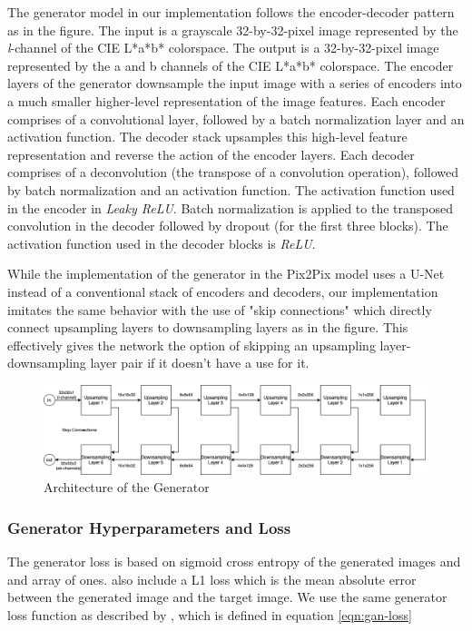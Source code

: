 \documentclass{article}
\begin{document}
The generator model in our implementation follows the encoder-decoder pattern as
in the figure. The input is a grayscale 32-by-32-pixel image represented by the
\textit{l}-channel of the CIE L*a*b* colorspace. The output is a 32-by-32-pixel
image represented by the a and b channels of the CIE L*a*b* colorspace. The
encoder layers of the generator downsample the input image with a series of
encoders into a much smaller higher-level representation of the image features.
Each encoder comprises of a convolutional layer, followed by a batch
normalization layer and an activation function. The decoder stack upsamples this
high-level feature representation and reverse the action of the encoder layers.
Each decoder comprises of a deconvolution (the transpose of a convolution
operation), followed by batch normalization and an activation function. The
activation function used in the encoder in \textit{Leaky ReLU}. Batch
normalization is applied to the transposed convolution in the decoder followed
by dropout (for the first three blocks). The activation function used in the
decoder blocks is \textit{ReLU}.

While the implementation of the generator in the Pix2Pix model uses a U-Net
instead of a conventional stack of encoders and decoders, our implementation
imitates the same behavior with the use of "skip connections" which directly
connect upsampling layers to downsampling layers as in the figure. This
effectively gives the network the option of skipping an upsampling
layer-downsampling layer pair if it doesn't have a use for it.

\begin{figure}[h]
  \centering
  \includegraphics[width=\textwidth]{Generator1.png}
  \caption{Architecture of the Generator}
  \label{fig:generator-architecture}
  \centering
\end{figure}

\subsubsection{Generator Hyperparameters and Loss}

The generator loss is based on sigmoid cross entropy of the generated images
and and array of ones. \cite{DBLP:journals/corr/IsolaZZE16} also include a L1
loss which is the mean absolute error between the generated image and the target
image. We use the same generator loss function as described by
\cite{DBLP:journals/corr/IsolaZZE16}, which is defined in equation \ref{eqn:gan-loss}
\end{document}
